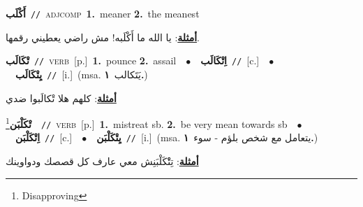 \documentclass[10pt,a4paper,twoside]{article} %
\begin{document}
\begin{multicols}{2}
{\setlength\topsep{0pt}\textbf{\foreignlanguage{arabic}{أَكْلَب}}\ {\color{gray}\texttt{//}\color{black}}\ \textsc{adj\textunderscore comp}\ \textbf{1.}~meaner  \textbf{2.}~the meanest\  \begin{flushright}\color{gray}\foreignlanguage{arabic}{\textbf{\underline{\foreignlanguage{arabic}{أمثلة}}}: يا الله ما أَكْلَبه! مش راضي يعطيني رقمها.}\end{flushright}\color{black}} \vspace{2mm}

{\setlength\topsep{0pt}\textbf{\foreignlanguage{arabic}{تْكَالَب}}\ {\color{gray}\texttt{//}\color{black}}\ \textsc{verb}\ [p.]\ \textbf{1.}~pounce  \textbf{2.}~assail\ \ $\bullet$\ \ \setlength\topsep{0pt}\textbf{\foreignlanguage{arabic}{اِتْكَالَب}}\ {\color{gray}\texttt{//}\color{black}}\ [c.]\ \ $\bullet$\ \ \setlength\topsep{0pt}\textbf{\foreignlanguage{arabic}{يِتْكَالَب}}\ {\color{gray}\texttt{//}\color{black}}\ [i.]\ \color{gray}(msa. \foreignlanguage{arabic}{يَتَكالب}~\foreignlanguage{arabic}{\textbf{١.}})\color{black}\  \begin{flushright}\color{gray}\foreignlanguage{arabic}{\textbf{\underline{\foreignlanguage{arabic}{أمثلة}}}: كلهم هلا تْكالَبوا ضدي}\end{flushright}\color{black}} \vspace{2mm}

{\setlength\topsep{0pt}\textbf{\foreignlanguage{arabic}{تْكَلْبَن}}\footnote{Disapproving}\ \ {\color{gray}\texttt{//}\color{black}}\ \textsc{verb}\ [p.]\ \textbf{1.}~mistreat sb.  \textbf{2.}~be very mean towards sb\ \ $\bullet$\ \ \setlength\topsep{0pt}\textbf{\foreignlanguage{arabic}{اِتْكَلْبَن}}\ {\color{gray}\texttt{//}\color{black}}\ [c.]\ \ $\bullet$\ \ \setlength\topsep{0pt}\textbf{\foreignlanguage{arabic}{يِتْكَلْبَن}}\ {\color{gray}\texttt{//}\color{black}}\ [i.]\ \color{gray}(msa. \foreignlanguage{arabic}{يتعامل مع شخص بلؤم - سوء}~\foreignlanguage{arabic}{\textbf{١.}})\color{black}\  \begin{flushright}\color{gray}\foreignlanguage{arabic}{\textbf{\underline{\foreignlanguage{arabic}{أمثلة}}}: تِتْْكَلْبَنِش معي عارف كل قصصك ودواوينك}\end{flushright}\color{black}} \vspace{2mm}


\end{multicols}
\end{document}
